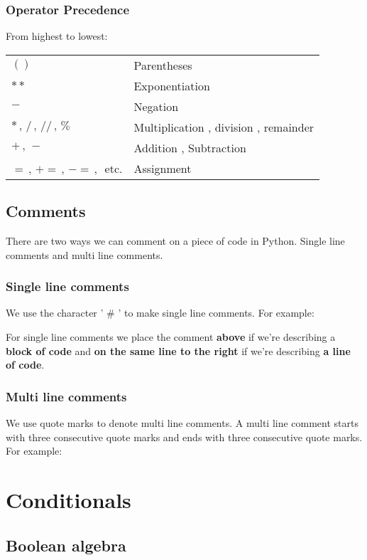 \documentclass[13pt,a4paper,oneside]{book}
\begin{document}
\subsection{Operator Precedence}%
\label{sub:Operator Precedence}
From highest to lowest:
\begin{center}
\begin{tabular}{l l}
	$()$ & Parentheses \\
	$* *$ & Exponentiation \\
	$-$ & Negation \\
	$*\,,\,/\,,\,/ /\,,\,\%$ & Multiplication , division , remainder \\
	$+\,,\,-$ & Addition , Subtraction \\
	$=\,,\,+=\,,\,-=\,,\,$ etc. & Assignment \\
\end{tabular}
\end{center}
\section{Comments}%
\label{sec:Comments}
There are two ways we can comment on a piece of code in Python. Single line comments and multi line comments.
\subsection*{Single line comments}%
\label{sub:Single line comments}
We use the character ' \# ' to make single line comments. For example:
	
	For single line comments we place the comment \textbf{above} if we're describing a \textbf{block of code} and \textbf{on the same line to the right} if we're describing \textbf{a line of code}.
\subsection*{Multi line comments}%
\label{sub:Multi line c}
We use quote marks to denote multi line comments. A multi line comment starts with three consecutive quote marks and ends with three consecutive quote marks. For example:
	
\chapter{Conditionals}%
\label{cha:Conditionals}
\section{Boolean algebra}%
\label{sec:Boolean algebra}
\end{document}
